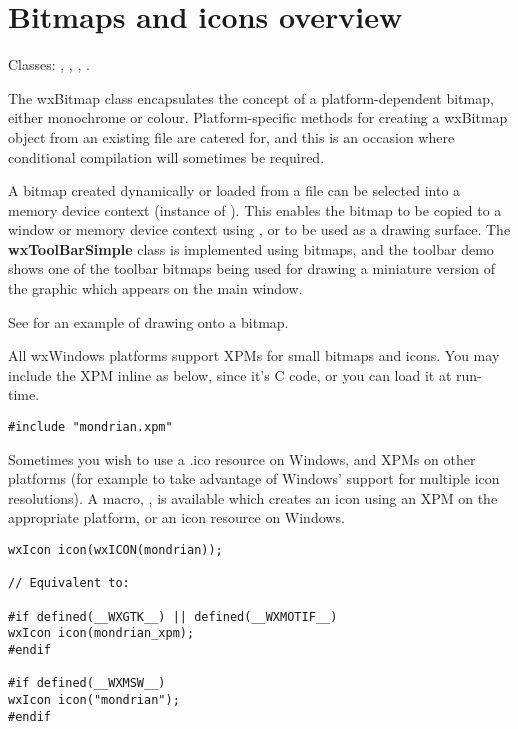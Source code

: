\section{Bitmaps and icons overview}\label{wxbitmapoverview}

Classes: , , , .

The wxBitmap class encapsulates the concept of a platform-dependent bitmap,
either monochrome or colour. Platform-specific methods for creating a
wxBitmap object from an existing file are catered for, and
this is an occasion where conditional compilation will sometimes be
required.

A bitmap created dynamically or loaded from a file can be selected
into a memory device context (instance of ). This
enables the bitmap to be copied to a window or memory device context
using , or to be used as a drawing surface.  The {\bf
wxToolBarSimple} class is implemented using bitmaps, and the toolbar demo
shows one of the toolbar bitmaps being used for drawing a miniature
version of the graphic which appears on the main window.

See  for an example of drawing onto a bitmap.

All wxWindows platforms support XPMs for small bitmaps and icons.
You may include the XPM inline as below, since it's C code, or you
can load it at run-time.

\begin{verbatim}
#include "mondrian.xpm"
\end{verbatim}

Sometimes you wish to use a .ico resource on Windows, and XPMs on
other platforms (for example to take advantage of Windows' support for multiple icon resolutions).
A macro, , is available which creates an icon using an XPM
on the appropriate platform, or an icon resource on Windows.

\begin{verbatim}
wxIcon icon(wxICON(mondrian));

// Equivalent to:

#if defined(__WXGTK__) || defined(__WXMOTIF__)
wxIcon icon(mondrian_xpm);
#endif

#if defined(__WXMSW__)
wxIcon icon("mondrian");
#endif
\end{verbatim}

